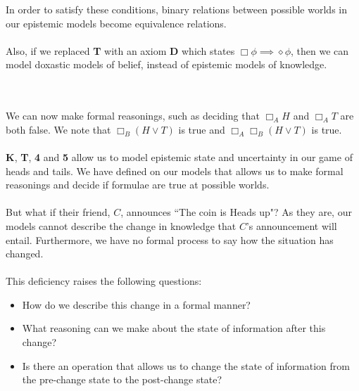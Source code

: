 \documentclass[12pt, a4paper, titlepage]{scrartcl}
\begin{document}
\begin{note}
In order to satisfy these conditions, binary relations between possible worlds
in our epistemic models become equivalence relations.\\
\\
Also, if we replaced {\bf T} with an axiom {\bf D} which states $\Box \phi
\implies \diamond \phi$, then we can model doxastic models of belief, instead of
epistemic models of knowledge.
\end{note}\\
\\
We can now make formal reasonings, such as deciding that $\Box_A H$ and $\Box_A
T$ are both false.
We note that $\Box_B (H \lor T)$ is true and $\Box_A \Box_B (H \lor T)$ is
true.\\
\\
{\bf K}, {\bf T}, {\bf 4} and {\bf 5} allow us to model epistemic state and
uncertainty in our game of heads and tails.
We have defined on our models that allows us to make formal reasonings and
decide if formulae are true at possible worlds.\\
\\
But what if their friend, $C$, announces ``The coin is Heads up"?
As they are, our models cannot describe the change in knowledge that
$C$'s announcement will entail.
Furthermore, we have no formal process to say how the situation has changed.\\
\\
This deficiency raises the following questions:
\begin{itemize}
	\item How do we describe this change in a formal manner?
	\item What reasoning can we make about the state of information after this
	change?
	\item Is there an operation that allows us to change the state of information
	from the pre-change state to the post-change state?
\end{itemize}
\end{document}

